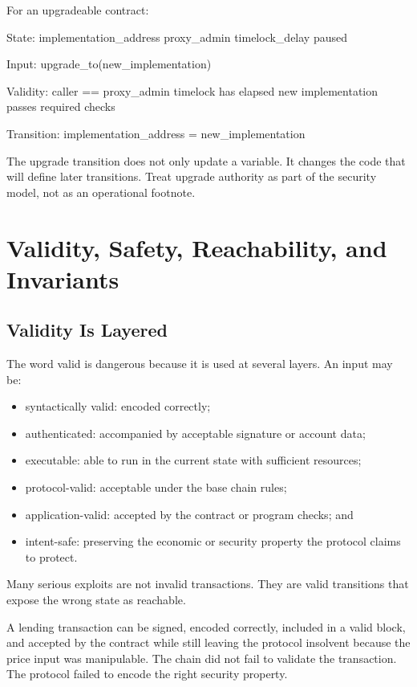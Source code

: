 For an upgradeable contract:

\begin{codeblock}
State:
    implementation_address
    proxy_admin
    timelock_delay
    paused

Input:
    upgrade_to(new_implementation)

Validity:
    caller == proxy_admin
    timelock has elapsed
    new implementation passes required checks

Transition:
    implementation_address = new_implementation
\end{codeblock}

The upgrade transition does not only update a variable. It changes the code that will define later transitions. Treat upgrade authority as part of the security model, not as an operational footnote.

\section{Validity, Safety, Reachability, and Invariants}

\subsection{Validity Is Layered}

The word valid is dangerous because it is used at several layers. An input may be:

\begin{itemize}
\item syntactically valid: encoded correctly;
\item authenticated: accompanied by acceptable signature or account data;
\item executable: able to run in the current state with sufficient resources;
\item protocol-valid: acceptable under the base chain rules;
\item application-valid: accepted by the contract or program checks; and
\item intent-safe: preserving the economic or security property the protocol claims to protect.
\end{itemize}

Many serious exploits are not invalid transactions. They are valid transitions that expose the wrong state as reachable.

\begin{failuremodebox}
A lending transaction can be signed, encoded correctly, included in a valid block, and accepted by the contract while still leaving the protocol insolvent because the price input was manipulable. The chain did not fail to validate the transaction. The protocol failed to encode the right security property.
\end{failuremodebox}

